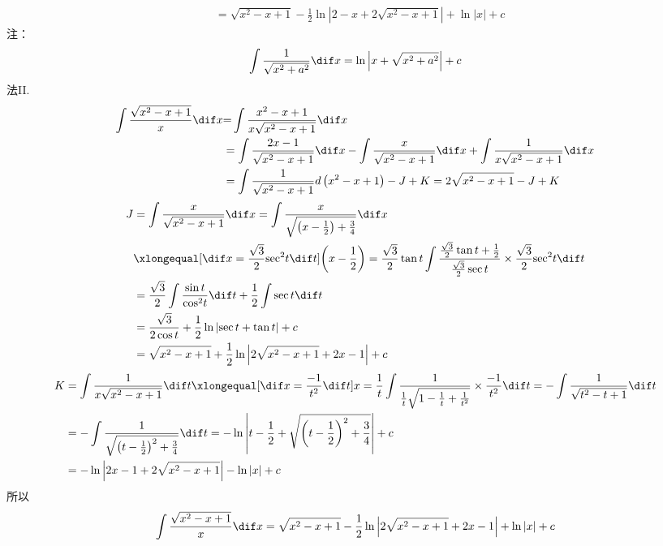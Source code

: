 \documentclass[color=green,titlestyle=hang]{elegantbook}%
\begin{document}
\begin{solution}
\begin{align*}
&= \sqrt {{x^2} - x + 1}  - \frac{1}{2}\ln \left| {2 - x + 2\sqrt {{x^2} - x + 1} } \right| + \ln \left| x \right| + c
\end{align*}
注：\[\int {\frac{1}{{\sqrt {{x^2} + {a^2}} }}\dif x = \ln \left| {x + \sqrt {{x^2} + {a^2}} } \right|}  + c\]
法II.
\begin{align*}
\int {\frac{{\sqrt {{x^2} - x + 1} }}{x}} \dif x&{\rm{ = }}\int {\frac{{{x^2} - x + 1}}{{x\sqrt {{x^2} - x + 1} }}\dif x} \\
&= \int {\frac{{2x - 1}}{{\sqrt {{x^2} - x + 1} }}\dif x}  - \int {\frac{x}{{\sqrt {{x^2} - x + 1} }}\dif x}  + \int {\frac{1}{{x\sqrt {{x^2} - x + 1} }}\dif x} \\
&= \int {\frac{1}{{\sqrt {{x^2} - x + 1} }}d\left( {{x^2} - x + 1} \right)}  - J + K = 2\sqrt {{x^2} - x + 1}  - J + K
\end{align*}
\begin{align*}
J &= \int {\frac{x}{{\sqrt {{x^2} - x + 1} }}\dif x}  = \int {\frac{x}{{\sqrt {\left( {x - \frac{1}{2}} \right) + \frac{3}{4}} }}\dif x} \\
& \xlongequal[{\dif x = \frac{{\sqrt 3 }}{2}{{\sec }^2}t\dif t}]{{\left( {x - \frac{1}{2}} \right) = \frac{{\sqrt 3 }}{2}\tan t}}\int {\frac{{\frac{{\sqrt 3 }}{2}\tan t + \frac{1}{2}}}{{\frac{{\sqrt 3 }}{2}\sec t}} \times \frac{{\sqrt 3 }}{2}{{\sec }^2}t\dif t} \\
&= \frac{{\sqrt 3 }}{2}\int {\frac{{\sin t}}{{{{\cos }^2}t}}} \dif t + \frac{1}{2}\int {\sec t} \dif t\\
&= \frac{{\sqrt 3 }}{{2\cos t}} + \frac{1}{2}\ln \left| {\sec t + \tan t} \right| + c\\
&= \sqrt {{x^2} - x + 1}  + \frac{1}{2}\ln \left| {2\sqrt {{x^2} - x + 1}  + 2x - 1} \right| + c
\end{align*}
\begin{align*}
K &= \int {\frac{1}{{x\sqrt {{x^2} - x + 1} }}} \dif t\xlongequal[{\dif x = \frac{{ - 1}}{{{t^2}}}\dif t}]{{x = \frac{1}{t}}}\int {\frac{1}{{\frac{1}{t}\sqrt {1 - \frac{1}{t} + \frac{1}{{{t^2}}}} }} \times \frac{{ - 1}}{{{t^2}}}} \dif t =  - \int {\frac{1}{{\sqrt {{t^2} - t + 1} }}} \dif t\\
&=  - \int {\frac{1}{{\sqrt {{{\left( {t - \frac{1}{2}} \right)}^2} + \frac{3}{4}} }}} \dif t =  - \ln \left| {t - \frac{1}{2} + \sqrt {{{\left( {t - \frac{1}{2}} \right)}^2} + \frac{3}{4}} } \right| + c\\
&=  - \ln \left| {2x - 1 + 2\sqrt {{x^2} - x + 1} } \right| - \ln \left| x \right| + c
\end{align*}
所以\[\int {\frac{{\sqrt {{x^2} - x + 1} }}{x}} \dif x = \sqrt {{x^2} - x + 1}  - \frac{1}{2}\ln \left| {2\sqrt {{x^2} - x + 1}  + 2x - 1} \right| + \ln \left| x \right| + c\]
\end{solution}
\end{document}
